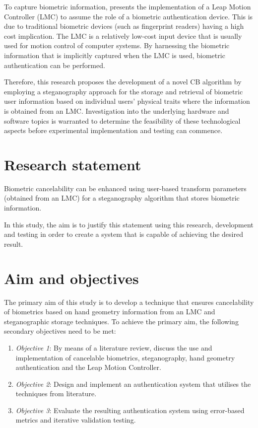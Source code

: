 To capture biometric information, \cite{Chan2015} presents the implementation of a Leap Motion Controller (LMC) to assume the role of a biometric authentication device. This is due to traditional biometric devices (such as fingerprint readers) having a high cost implication. The LMC is a relatively low-cost input device that is usually used for motion control of computer systems. By harnessing the biometric information that is implicitly captured when the LMC is used, biometric authentication can be performed. 

Therefore, this research proposes the development of a novel CB algorithm by employing a steganography approach for the storage and retrieval of biometric user information based on individual users’ physical traits where the information is obtained from an LMC. Investigation into the underlying hardware and software topics is warranted to determine the feasibility of these technological aspects before experimental implementation and testing can commence.


\section{Research statement}  %
\label{section1.3}

Biometric cancelability can be enhanced using user-based transform parameters (obtained from an LMC) for a steganography algorithm that stores biometric information.

In this study, the aim is to justify this statement using this research, development and testing in order to create a system that is capable of achieving the desired result.

\section{Aim and objectives}  %
\label{section1.4}
The primary aim of this study is to develop a technique that ensures cancelability of biometrics based on hand geometry information from an LMC and steganographic storage techniques.
To achieve the primary aim, the following secondary objectives need to be met:

\begin{enumerate}[label=\roman*.]
\item \textit{Objective 1}: By means of a literature review, discuss the use and implementation of cancelable biometrics, steganography, hand geometry authentication and the Leap Motion Controller.
\item \textit{Objective 2}: Design and implement an authentication system that utilises the techniques from literature.
\item \textit{Objective 3}: Evaluate the resulting authentication system using error-based metrics and iterative validation testing.
\end{enumerate}

